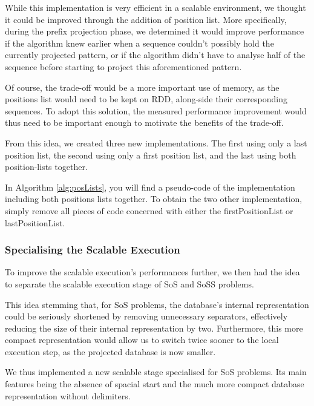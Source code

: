 \documentclass{eplmastersthesis}
\begin{document}
While this implementation is very efficient in a scalable environment, we thought it could be improved through the addition of position list. More specifically, during the prefix projection phase, we determined it would improve performance if the algorithm knew earlier when a sequence couldn't possibly hold the currently projected pattern, or if the algorithm didn't have to analyse half of the sequence before starting to project this aforementioned pattern. \newline

Of course, the trade-off would be a more important use of memory, as the positions list would need to be kept on RDD, along-side their corresponding sequences. To adopt this solution, the measured performance improvement would thus need to be important enough to motivate the benefits of the trade-off. \newline

From this idea, we created three new implementations. The first using only a last position list, the second using only a first position list, and the last using both position-lists together. \newline

In Algorithm \ref{alg:posLists}, you will find a pseudo-code of the implementation including both positions lists together. To obtain the two other implementation, simply remove all pieces of code concerned with either the firstPositionList or lastPositionList.

\subsubsection{Specialising the Scalable Execution}

To improve the scalable execution's performances further, we then had the idea to separate the scalable execution stage of \acrshort{SoS} and \acrshort{SoSS} problems. \newline

This idea stemming that, for \acrshort{SoS} problems, the database's internal representation could be seriously shortened by removing unnecessary separators, effectively reducing the size of their internal representation by two. Furthermore, this more compact representation would allow us to switch twice sooner to the local execution step, as the projected database is now smaller. \newline

We thus implemented a new scalable stage specialised for \acrlong{SoS} problems. Its main features being the absence of spacial start and the much more compact database representation without delimiters. \newline
\end{document}
